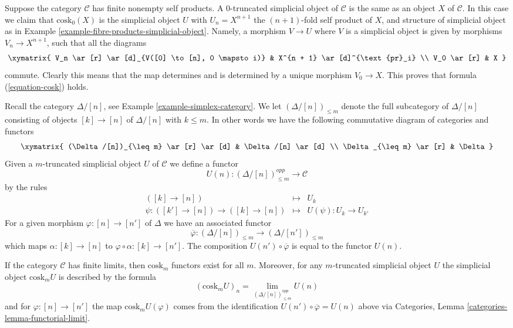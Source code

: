 \begin{example}
\label{example-cosk0}
Suppose the category $\mathcal{C}$ has finite nonempty self products.
A $0$-truncated simplicial object of $\mathcal{C}$ is the same
as an object $X$ of $\mathcal{C}$. In this case
we claim that $\text{cosk}_0(X)$ is the simplicial
object $U$ with $U_n = X^{n + 1}$ the $(n + 1)$-fold self
product of $X$, and structure of simplicial object
as in Example \ref{example-fibre-products-simplicial-object}.
Namely, a morphism $V \to U$ where $V$ is a simplicial
object is given by morphisms $V_n \to X^{n + 1}$, such
that all the diagrams
$$
\xymatrix{
V_n \ar[r] \ar[d]_{V([0] \to [n], 0 \mapsto i)} &
X^{n + 1} \ar[d]^{\text{pr}_i} \\
V_0 \ar[r] &
X
}
$$
commute. Clearly this means that the map determines and is determined
by a unique morphism $V_0 \to X$. This proves that formula
(\ref{equation-cosk}) holds.
\end{example}

\noindent
Recall the category $\Delta/[n]$, see Example \ref{example-simplex-category}.
We let $(\Delta/[n])_{\leq m}$ denote the full subcategory
of $\Delta/[n]$ consisting of objects $[k] \to [n]$
of $\Delta/[n]$ with $k \leq m$. In other words we have
the following commutative diagram of categories and functors
$$
\xymatrix{
(\Delta/[n])_{\leq m} \ar[r] \ar[d] &
\Delta/[n] \ar[d] \\
\Delta_{\leq m} \ar[r] &
\Delta
}
$$
Given a $m$-truncated
simplicial object $U$ of $\mathcal{C}$
we define a functor
$$
U(n) : (\Delta/[n])_{\leq m}^{opp} \longrightarrow \mathcal{C}
$$
by the rules
\begin{eqnarray*}
([k] \to [n]) & \longmapsto & U_k \\
\psi : ([k'] \to [n]) \to ([k] \to [n]) &
\longmapsto &
U(\psi) : U_k \to U_{k'}
\end{eqnarray*}
For a given morphism $\varphi : [n] \to [n']$ of $\Delta$
we have an associated functor
$$
\overline{\varphi} :
(\Delta/[n])_{\leq m}
\longrightarrow
(\Delta/[n'])_{\leq m}
$$
which maps $\alpha : [k] \to [n]$ to
$\varphi \circ \alpha : [k] \to [n']$.
The composition $U(n') \circ \overline{\varphi}$ is
equal to the functor $U(n)$.

\begin{lemma}
\label{lemma-existence-cosk}
If the category $\mathcal{C}$ has finite limits, then
$\text{cosk}_m$ functors exist for all $m$. Moreover,
for any $m$-truncated simplicial object $U$ the
simplicial object $\text{cosk}_mU$ is described
by the formula
$$
(\text{cosk}_mU)_n = \lim_{(\Delta/[n])_{\leq m}^{opp}} U(n)
$$
and for $\varphi : [n] \to [n']$ the map
$\text{cosk}_mU(\varphi)$ comes from the
identification $U(n') \circ \overline{\varphi} = U(n)$ above
via Categories, Lemma \ref{categories-lemma-functorial-limit}.
\end{lemma}

